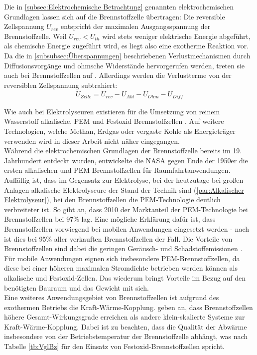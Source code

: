 Die in \ref{subsec:Elektrochemische Betrachtung} genannten elektrochemischen Grundlagen lassen sich auf die Brennstoffzelle übertragen: Die reversible Zellspannung $U_{rev}$ entspricht der maximalen Ausgangsspannung der Brennstoffzelle. Weil $U_{rev} < U_{th}$ wird stets weniger elektrische Energie abgeführt, als chemische Energie zugeführt wird, es liegt also eine exotherme Reaktion vor. Da die in \ref{subsubsec:Überspannungen} beschriebenen Verlustmechanismen durch Diffusionsvorgänge und ohmsche Widerstände hervorgerufen werden, treten sie auch bei Brennstoffzellen auf \citep{chugh_experimental_2020}. Allerdings werden die Verlustterme von der reversiblen Zellspannung subtrahiert:
\begin{align}
	\label{gl:U_real-BZ}
	U_{Zelle} =  U_{rev} - U_{Akt} - U_{Ohm} - U_{Diff}
\end{align}   

Wie auch bei Elektrolyseuren existieren für die Umsetzung von reinem Wasserstoff alkalische, PEM und Festoxid Brennstoffzellen \citep{lucia_overview_2014}. Auf weitere Technologien, welche Methan, Erdgas oder vergaste Kohle als Energieträger verwenden wird in dieser Arbeit nicht näher eingegangen.\\

Während die elektrochemischen Grundlagen der Brennstoffzelle bereits im 19. Jahrhundert entdeckt wurden, entwickelte die NASA   gegen Ende der 1950er die ersten alkalischen und PEM Brennstoffzellen für Raumfahrtanwendungen. Auffällig ist, dass im Gegensatz zur Elektrolyse, bei der heutzutage bei großen Anlagen alkalische Elektrolyseure der Stand der Technik sind (\ref{par:Alkalischer Elektrolyseur}), bei den Brennstoffzellen die PEM-Technologie deutlich verbreiteter ist. So gibt \citet{lucia_overview_2014} an, dass 2010  der Marktanteil der PEM-Technologie bei Brennstoffzellen bei 97\% lag. Eine mögliche Erklärung dafür ist, dass Brennstoffzellen vorwiegend bei mobilen Anwendungen eingesetzt werden - nach \citet{lucia_overview_2014} ist dies bei 95\% aller verkauften Brennstoffzellen der Fall. Die Vorteile von Brennstoffzellen sind dabei die geringen Geräusch- und Schadstoffemissionen \citep{olabi_prospects_2020}. Für mobile Anwendungen eignen sich insbesondere PEM-Brennstoffzellen, da diese bei einer höheren maximalen Stromdichte betrieben werden können als alkalische und Festoxid-Zellen. Das wiederum bringt  Vorteile im Bezug auf den benötigten Bauraum und das Gewicht mit sich.\\ 

Eine weiteres Anwendungsgebiet von Brennstoffzellen ist aufgrund des exothermen Betriebs die Kraft-Wärme-Kopplung. \citet{olabi_prospects_2020} geben an, dass Brennstoffzellen höhere Gesamt-Wirkungsgrade erreichen als andere klein-skalierte Systeme zur Kraft-Wärme-Kopplung. Dabei ist zu beachten, dass die Qualität der Abwärme insbesondere von der Betriebstemperatur der Brennstoffzelle abhängt, was nach Tabelle \ref{tb:VglBz} für den Einsatz von Festoxid-Brennstoffzellen spricht.\\ 


